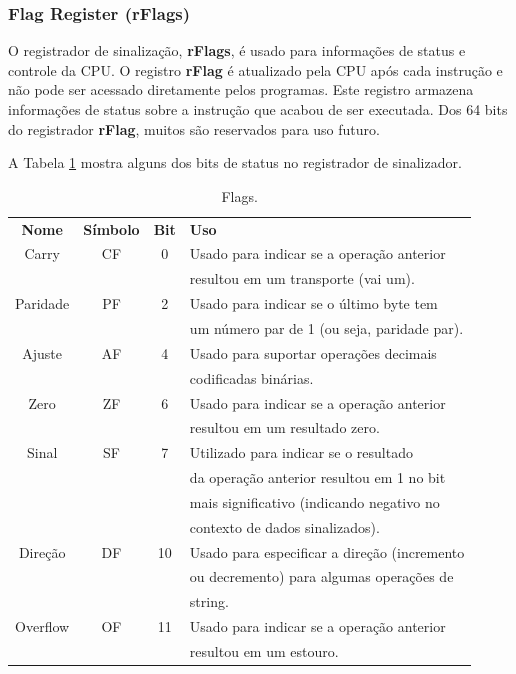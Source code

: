 \subsubsection{Flag Register (rFlags)}
O registrador de sinalização, \textbf{rFlags}, é usado para informações de status e controle da CPU. O registro \textbf{rFlag} é atualizado pela CPU após cada instrução e não pode ser acessado diretamente pelos programas. Este registro armazena informações de status sobre a instrução que acabou de ser executada. Dos 64 bits do registrador \textbf{rFlag}, muitos são reservados para uso futuro.

A Tabela \ref{tab:flags} mostra alguns dos bits de status no registrador de sinalizador.

\begin{table}[h]
	\centering
	\begin{tabular}{|c|c|c|l|}
		\hline
		\rowcolor[HTML]{C0C0C0} 
		\textbf{Nome} & \textbf{Símbolo} & \textbf{Bit} & \textbf{Uso} \\ 
		Carry & CF & 0  & Usado para indicar se a operação anterior\\
		& & & resultou em um transporte (vai um).\\ \hline
		Paridade & PF& 2 & Usado para indicar se o último byte tem\\
		& & &  um número par de 1 (ou seja, paridade par).\\ \hline
		Ajuste & AF& 4 & Usado para suportar operações decimais\\
		& & &  codificadas binárias.\\ \hline
		Zero & ZF& 6 & Usado para indicar se a operação anterior\\
		& & &  resultou em um resultado zero.\\ \hline
		Sinal & SF& 7 & Utilizado para indicar se o resultado\\
		& & &  da operação anterior resultou em 1 no bit\\
		& & &  mais significativo (indicando negativo no\\
		& & &  contexto de dados sinalizados).\\ \hline
		Direção & DF& 10 & Usado para especificar a direção (incremento\\
		& & &  ou decremento) para algumas operações de\\
		& & &  string.\\ \hline
		Overflow & OF& 11 & Usado para indicar se a operação anterior\\
		& & &  resultou em um estouro.\\ \hline
	\end{tabular}
	
	\caption{Flags.}
	\label{tab:flags}
\end{table}

